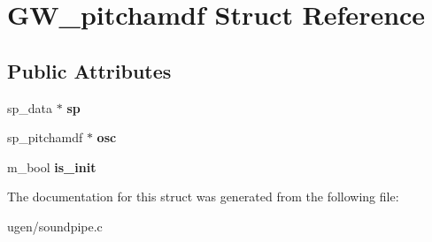 \hypertarget{structGW__pitchamdf}{}\section{G\+W\+\_\+pitchamdf Struct Reference}
\label{structGW__pitchamdf}
\subsection*{Public Attributes}
\begin{DoxyCompactItemize}
\item 
\hypertarget{structGW__pitchamdf_a1bcce05212a10668eeb59778d74b1ff4}{}\label{structGW__pitchamdf_a1bcce05212a10668eeb59778d74b1ff4} 
sp\+\_\+data $\ast$ {\bfseries sp}
\item 
\hypertarget{structGW__pitchamdf_a208e8988ea8ef0067acd6d52daf81897}{}\label{structGW__pitchamdf_a208e8988ea8ef0067acd6d52daf81897} 
sp\+\_\+pitchamdf $\ast$ {\bfseries osc}
\item 
\hypertarget{structGW__pitchamdf_ac1d62ec255787569ba986193f91404a7}{}\label{structGW__pitchamdf_ac1d62ec255787569ba986193f91404a7} 
m\+\_\+bool {\bfseries is\+\_\+init}
\end{DoxyCompactItemize}


The documentation for this struct was generated from the following file\+:\begin{DoxyCompactItemize}
\item 
ugen/soundpipe.\+c\end{DoxyCompactItemize}
